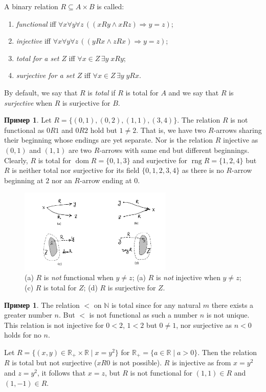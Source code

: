 \documentclass[12pt,notitlepage]{article}
\theoremstyle{plain}
\theoremstyle{definition}
\newtheorem{exm}[thm]{Пример}
\theoremstyle{plain}
\newcommand{\N}{\mathbb{N}}
\newcommand{\R}{\mathbb{R}}
\newcommand{\sbs}{\subseteq}
\newcommand{\dom}{\mathop{\mathrm{dom}}}
\newcommand{\rng}{\mathop{\mathrm{rng}}}
\newcommand{\1}{\mathbf{1}}
\newcommand{\0}{\mathbf{0}}
\newcommand{\ply}{\Longrightarrow}
\begin{document}
A binary relation $R \sbs A \times B$ is called:
\begin{enumerate}
	\item \emph{functional} iff $\forall x \forall y \forall z\, ( (x R y \wedge x R z) \ply y = z )$;
	\item \emph{injective} iff $\forall x \forall y \forall z\, ( (y R x \wedge z R x) \ply y = z )$;
	\item \emph{total for a set $Z$} iff $\forall x \in Z\, \exists y\; x R y$;
	\item \emph{surjective for a set $Z$} iff $\forall x \in Z\, \exists y\; y R x$.
\end{enumerate}
By default, we say that $R$ is \emph{total} if $R$ is total for $A$ and we say that $R$ is \emph{surjective} when $R$ is surjective for $B$.

\begin{exm}
	Let $R = \{(0,1), (0,2), (1,1), (3,4)\}$. The relation $R$ is not functional as $0 R 1$ and $0 R 2$ hold but $1 \neq 2$. That is, we have two $R$-arrows sharing their beginning whose endings are yet separate. Nor is the relation $R$ injective as $(0, 1)$ and $(1, 1)$ are two $R$-arrows with same end but different beginnings. Clearly, $R$ is total for $\dom R = \{0,1,3\}$ and surjective for $\rng R = \{1,2,4\}$ but $R$ is neither total nor surjective for its field $\{0,1,2,3,4\}$ as there is no $R$-arrow beginning at $2$ nor an $R$-arrow ending at $0$.
\end{exm}

\begin{figure}[h]
	\centering
	\includegraphics*[width=0.65\textwidth]{func_etc.pdf}
	\caption{(a) $R$ is \emph{not} functional when $y \neq z$; (a) $R$ is \emph{not} injective when $y \neq z$; (c) $R$ is total for $Z$; (d) $R$ is surjective for $Z$.}
\end{figure}


\begin{exm}
	The relation ${<}$ on $\N$ is total since for any natural $m$ there exists a greater number $n$. But ${<}$ is not functional as such a number $n$ is not unique. This relation is not injective for $0 < 2$, $1 < 2$ but $0 \neq 1$, nor surjective as $n < 0$ holds for no $n$. 
	
	Let $R = \{(x,y) \in \R_{+} \times \R \mid x = y^2 \}$ for $\R_+ = \{a \in \R  \mid a > 0\}$. Then the relation $R$ is total but not surjective ($xR0$ is not possible). $R$ is injective as from $x = y^2$ and $z = y^2$, it follows that $x = z$, but $R$ is not functional for $(1, 1) \in R$ and $(1, -1) \in R$.
\end{exm}
\end{document}
